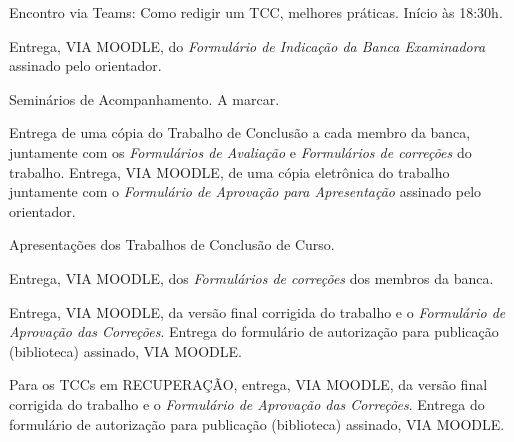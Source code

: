     {Encontro via Teams: Como redigir um TCC, melhores práticas. Início às 18:30h.}%

    {Entrega, VIA MOODLE, do \emph{Formulário de Indicação da Banca Examinadora} assinado pelo orientador. }

    {
     Seminários de Acompanhamento. A marcar.
    }

    {Entrega de uma cópia do Trabalho de Conclusão a cada membro da banca, juntamente com os \emph{Formulários de Avaliação} e \emph{Formulários de correções} do trabalho. Entrega, VIA MOODLE, de uma cópia eletrônica do trabalho juntamente com o \emph{Formulário de Aprovação para Apresentação} assinado pelo orientador.}


    {Apresentações dos Trabalhos de Conclusão de Curso. }

    {Entrega, VIA MOODLE, dos \emph{Formulários de correções} dos membros da banca.}

    {Entrega, VIA MOODLE, da versão final corrigida do trabalho e o \emph{Formulário de Aprovação das Correções}. Entrega do formulário de autorização para publicação (biblioteca) assinado, VIA MOODLE. }

    {Para os TCCs em RECUPERAÇÃO, entrega, VIA MOODLE, da versão final corrigida do trabalho e o \emph{Formulário de Aprovação das Correções}. Entrega do formulário de autorização para publicação (biblioteca) assinado, VIA MOODLE. }


